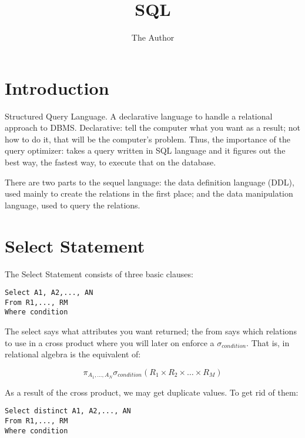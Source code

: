 \documentclass[11pt, oneside]{article}   	%
\title{SQL}
\author{The Author}
\begin{document}
\maketitle

\section{Introduction}

Structured Query Language. A declarative language to handle a relational approach to DBMS. Declarative: tell the computer what you want as a result; not how to do it, that will be the computer's problem. Thus, the importance of the query optimizer: takes a query written in SQL language and it figures out the best way, the fastest way, to execute that on the database. 

There are two parts to the sequel language: the data definition language (DDL), used mainly to create the relations in the first place; and the data manipulation language, used to query the relations. 

\section{Select Statement}

The Select Statement consists of three basic clauses:

\begin{lstlisting}
Select A1, A2,..., AN
From R1,..., RM
Where condition
\end{lstlisting}

The select says what attributes you want returned; the from says which relations to use in a cross product where you will later on enforce a $\sigma_{condition}$. That is, in relational algebra is the equivalent of:

$$ \pi_{A_1, \ldots, A_N} \sigma_{condition} ( R_1 \times R_2 \times \ldots \times R_M ) $$

As a result of the cross product, we may get duplicate values. To get rid of them:

\begin{lstlisting}
Select distinct A1, A2,..., AN
From R1,..., RM
Where condition
\end{lstlisting}
\end{document}
